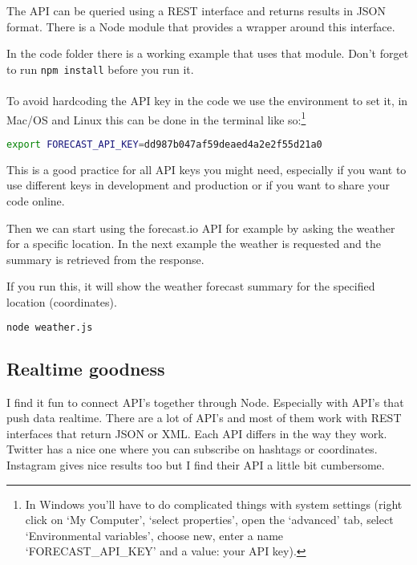 \documentclass[a4paper]{report}
\begin{document}
The API can be queried using a REST interface and returns results in JSON format. There is a Node module that provides a wrapper around this interface.

In the code folder there is a working example that uses that module. Don't forget to run \colorbox{codecol}{\lstinline[language=bash]{npm install}} before you run it.
\\
\\
\noindent To avoid hardcoding the API key in the code we use the environment to set it, in Mac/OS and Linux this can be done in the terminal like so:\footnote{In Windows you'll have to do complicated things with system settings (right click on `My Computer', `select properties', open the `advanced' tab, select `Environmental variables', choose new, enter a name `FORECAST\_API\_KEY' and a value: your API key).}
\begin{lstlisting}[language=bash]
export FORECAST_API_KEY=dd987b047af59deaed4a2e2f55d21a0
\end{lstlisting}

\noindent This is a good practice for all API keys you might need, especially if you want to use different keys in development and production or if you want to share your code online.

\noindent Then we can start using the forecast.io API for example by asking the weather for a specific location. In the next example the weather is requested and the summary is retrieved from the response.



\noindent If you run this, it will show the weather forecast summary for the specified location (coordinates).

\begin{lstlisting}[language=bash]
node weather.js
\end{lstlisting}

\subsection*{Realtime goodness}
I find it fun to connect API's together through Node. Especially with API's that push data realtime. There are a lot of API's and most of them work with REST interfaces that return JSON or XML. Each API differs in the way they work. Twitter has a nice one where you can subscribe on hashtags or coordinates. Instagram gives nice results too but I find their API a little bit cumbersome. 
\end{document}
